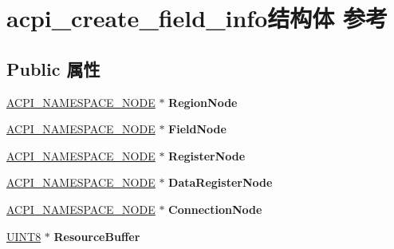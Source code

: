 \hypertarget{structacpi__create__field__info}{}\section{acpi\+\_\+create\+\_\+field\+\_\+info结构体 参考}
\label{structacpi__create__field__info}
\subsection*{Public 属性}
\begin{DoxyCompactItemize}
\item 
\mbox{\label{structacpi__create__field__info_a416989ba1c1f8f01b46c4fc9f14e6588}} 
\hyperlink{structacpi__namespace__node}{A\+C\+P\+I\+\_\+\+N\+A\+M\+E\+S\+P\+A\+C\+E\+\_\+\+N\+O\+DE} $\ast$ {\bfseries Region\+Node}
\item 
\mbox{\label{structacpi__create__field__info_ad13a1fb1dabafa934deeb9598d7e66cb}} 
\hyperlink{structacpi__namespace__node}{A\+C\+P\+I\+\_\+\+N\+A\+M\+E\+S\+P\+A\+C\+E\+\_\+\+N\+O\+DE} $\ast$ {\bfseries Field\+Node}
\item 
\mbox{\label{structacpi__create__field__info_acbcdde0bb8a7707af4979a8e1912aec9}} 
\hyperlink{structacpi__namespace__node}{A\+C\+P\+I\+\_\+\+N\+A\+M\+E\+S\+P\+A\+C\+E\+\_\+\+N\+O\+DE} $\ast$ {\bfseries Register\+Node}
\item 
\mbox{\label{structacpi__create__field__info_a133cb86cf1c65ed6173315507cb14114}} 
\hyperlink{structacpi__namespace__node}{A\+C\+P\+I\+\_\+\+N\+A\+M\+E\+S\+P\+A\+C\+E\+\_\+\+N\+O\+DE} $\ast$ {\bfseries Data\+Register\+Node}
\item 
\mbox{\label{structacpi__create__field__info_ade1f2f9b1845592333eb4f3a11eea0d9}} 
\hyperlink{structacpi__namespace__node}{A\+C\+P\+I\+\_\+\+N\+A\+M\+E\+S\+P\+A\+C\+E\+\_\+\+N\+O\+DE} $\ast$ {\bfseries Connection\+Node}
\item 
\mbox{\label{structacpi__create__field__info_a34d2943f2fa99214d3496104e5b6da71}} 
\hyperlink{_processor_bind_8h_ab27e9918b538ce9d8ca692479b375b6a}{U\+I\+N\+T8} $\ast$ {\bfseries Resource\+Buffer}

\end{DoxyCompactItemize}
